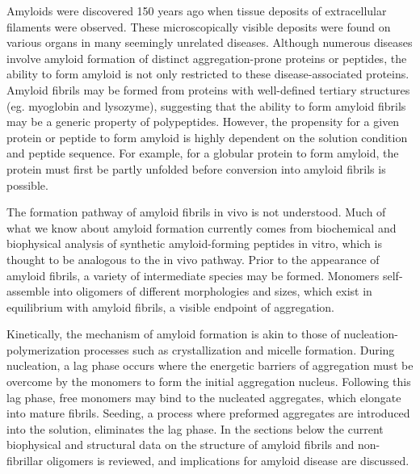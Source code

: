 Amyloids were discovered 150 years ago when tissue deposits of extracellular filaments were observed.\cite{Haass:2007db,Sipe:2000fs} These microscopically visible deposits were found on various organs in many seemingly unrelated diseases. 
Although numerous diseases involve amyloid formation of distinct aggregation-prone proteins or peptides, the ability to form amyloid is not only restricted to these disease-associated proteins. Amyloid fibrils may be formed from proteins with well-defined tertiary structures (eg. myoglobin and lysozyme), suggesting that the ability to form amyloid fibrils may be a generic property of polypeptides.\cite{Chiti:2006fz} However, the propensity for a given protein or peptide to form amyloid is highly dependent on the solution condition and peptide sequence. For example, for a globular protein to form amyloid, the protein must first be partly unfolded before conversion into amyloid fibrils is possible.\cite{Chiti:2006fz} 


The formation pathway of amyloid fibrils in vivo is not understood. Much of what we know about amyloid formation currently comes from biochemical and biophysical analysis of synthetic amyloid-forming peptides in vitro, which is thought to be analogous to the in vivo pathway. Prior to the appearance of amyloid fibrils, a variety of intermediate species may be formed.\cite{Chiti:2006fz}  Monomers self-assemble into oligomers of different morphologies and sizes, which exist in equilibrium with amyloid fibrils, a visible endpoint of aggregation.\cite{Chiti:2006fz}

Kinetically, the mechanism of amyloid formation is akin to those of nucleation-polymerization processes such as crystallization and micelle formation.\cite{Murphy:2002fe}
During nucleation, a lag phase occurs where the energetic barriers of aggregation must be overcome by the monomers to form the initial aggregation nucleus.\cite{Murphy:2002fe} Following this lag phase, free monomers may bind to the nucleated aggregates, which elongate into mature fibrils.\cite{Murphy:2002fe} Seeding, a process where preformed aggregates are introduced into the solution, eliminates the lag phase.\cite{Harper:1997ix,Jarrett:1993vm} In the sections below the current biophysical and structural data on the structure of amyloid fibrils and non-fibrillar oligomers is reviewed, and implications for amyloid disease are discussed.

